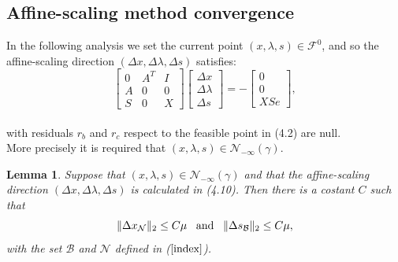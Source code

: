 \documentclass[a4paper,10 pt,titlepage,twoside]{book}
\theoremstyle{plain}
\newtheorem{lem}[thm]{Lemma}
\theoremstyle{definition}
\theoremstyle{remark}
\begin{document}
\subsection{Affine-scaling method convergence}
In the following analysis we set the current point $(x, \lambda, s)\in\mathcal{F}^{0}$, and so the affine-scaling direction $(\Delta x, \Delta \lambda, \Delta s)$ satisfies:\\
\begin{equation}\label{5.1}\tag{4.10}
\begin{bmatrix}
0&A^{T}&I \\A&0&0\\S&0&X
\end{bmatrix}\begin{bmatrix}
\Delta x\\\Delta\lambda \\\Delta s
\end{bmatrix}=-\begin{bmatrix}
0\\0\\XSe
\end{bmatrix},
\end{equation}\\
with residuals $r_{b}$ and $r_{c}$ respect to the feasible point in (4.2) are null.\\More precisely it is required that $(x, \lambda, s)\in\mathcal{N}_{- \infty}(\gamma)$.
\begin{lem}
	Suppose that $(x, \lambda, s)\in\mathcal{N}_{- \infty}(\gamma)$ and that the affine-scaling direction $(\Delta x,\Delta \lambda, \Delta s)$ is calculated in (4.10). Then there is a costant $C$ such that
	\begin{equation*}
	\lVert \Delta x_{\mathcal{N}} \rVert_{2} \leq C \mu \text{\;\;\;and\;\;\;} \lVert \Delta s_\mathcal{B} \rVert_{2} \leq C \mu,
	\end{equation*}
	with the set $\mathcal{B}$ and  $\mathcal{N}$ defined in ($\ref{index}$). 
\end{lem}
\end{document}
